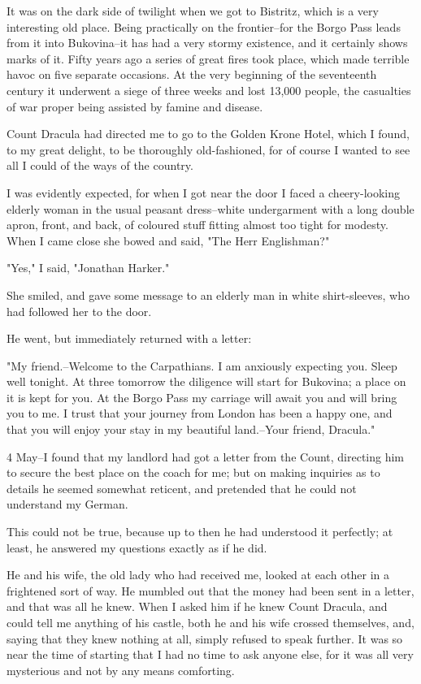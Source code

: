 It was on the dark side of twilight when we got to Bistritz, which is a very interesting old place. Being practically on the frontier--for the Borgo Pass leads from it into Bukovina--it has had a very stormy existence, and it certainly shows marks of it. Fifty years ago a series of great fires took place, which made terrible havoc on five separate occasions. At the very beginning of the seventeenth century it underwent a siege of three weeks and lost 13,000 people, the casualties of war proper being assisted by famine and disease.

Count Dracula had directed me to go to the Golden Krone Hotel, which I found, to my great delight, to be thoroughly old-fashioned, for of course I wanted to see all I could of the ways of the country.

I was evidently expected, for when I got near the door I faced a cheery-looking elderly woman in the usual peasant dress--white undergarment with a long double apron, front, and back, of coloured stuff fitting almost too tight for modesty. When I came close she bowed and said, "The Herr Englishman?"

"Yes," I said, "Jonathan Harker."

She smiled, and gave some message to an elderly man in white shirt-sleeves, who had followed her to the door.

He went, but immediately returned with a letter:

"My friend.--Welcome to the Carpathians. I am anxiously expecting you. Sleep well tonight. At three tomorrow the diligence will start for Bukovina; a place on it is kept for you. At the Borgo Pass my carriage will await you and will bring you to me. I trust that your journey from London has been a happy one, and that you will enjoy your stay in my beautiful land.--Your friend, Dracula."

4 May--I found that my landlord had got a letter from the Count, directing him to secure the best place on the coach for me; but on making inquiries as to details he seemed somewhat reticent, and pretended that he could not understand my German.

This could not be true, because up to then he had understood it perfectly; at least, he answered my questions exactly as if he did.

He and his wife, the old lady who had received me, looked at each other in a frightened sort of way. He mumbled out that the money had been sent in a letter, and that was all he knew. When I asked him if he knew Count Dracula, and could tell me anything of his castle, both he and his wife crossed themselves, and, saying that they knew nothing at all, simply refused to speak further. It was so near the time of starting that I had no time to ask anyone else, for it was all very mysterious and not by any means comforting.

